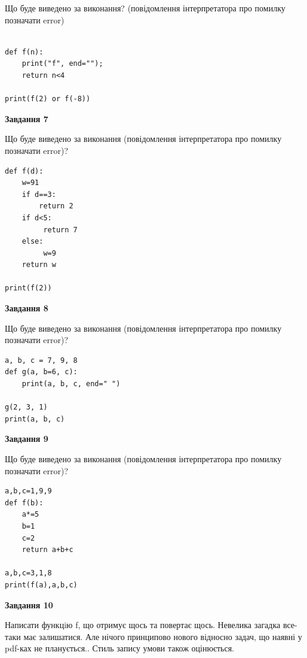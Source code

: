 \documentclass[12pt, ukrainian]{article}
\begin{document}
{\begin {large}
Що буде виведено за виконання? (повідомлення інтерпретатора про помилку позначати error)\par
\begin{verbatim}

def f(n):
    print("f", end="");
    return n<4

print(f(2) or f(-8))
\end{verbatim}

{\begin {center}\textbf{Завдання 7}\end {center}}

Що буде виведено за виконання (повідомлення інтерпретатора про помилку позначати error)?\par
\begin{verbatim}
def f(d):
    w=91
    if d==3: 
        return 2
    if d<5:
         return 7
    else:
         w=9
    return w

print(f(2))
\end{verbatim}

{\begin {center}\textbf{Завдання 8}\end {center}}

Що буде виведено за виконання (повідомлення інтерпретатора про помилку позначати error)?\par
\begin{verbatim}
a, b, c = 7, 9, 8
def g(a, b=6, c):
    print(a, b, c, end=" ")

g(2, 3, 1)
print(a, b, c)
\end{verbatim}

{\begin {center}\textbf{Завдання 9}\end {center}}

Що буде виведено за виконання (повідомлення інтерпретатора про помилку позначати error)?\par
\begin{verbatim}
a,b,c=1,9,9
def f(b):
    a*=5
    b=1
    c=2
    return a+b+c

a,b,c=3,1,8
print(f(a),a,b,c)
\end{verbatim}

{\begin {center}\textbf{Завдання 10}\end {center}}


Написати функцiю f, що отримує щось та повертає щось. Невелика загадка все-таки має залишатися. Але нічого принципово нового відносно задач, що наявні у pdf-ках не планується.. Стиль запису умови також оцінюється.\par
\end {large}}
\newpage
\end{document}
